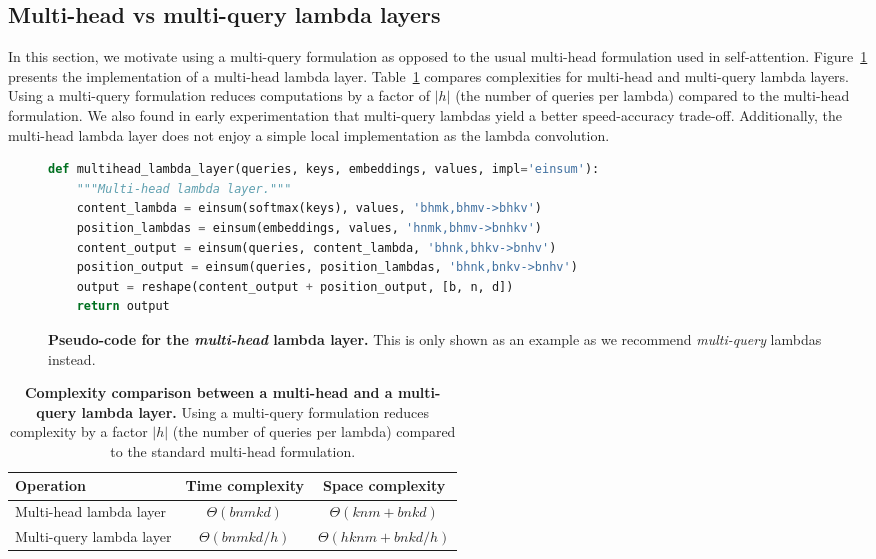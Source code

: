 \documentclass{article} \usepackage{iclr2021_conference,times}
\begin{document}
\subsection{Multi-head vs multi-query lambda layers}
In this section, we motivate using a multi-query formulation as opposed to the usual multi-head formulation used in self-attention.
Figure~\ref{fig:multihead_lambda_layer_code} presents the implementation of a multi-head lambda layer.
Table~\ref{tab:multihead_vs_multiquery} compares complexities for multi-head and multi-query lambda layers.
Using a multi-query formulation reduces computations by a factor of $|h|$ (the number of queries per lambda) compared to the multi-head formulation.
We also found in early experimentation that multi-query lambdas yield a better speed-accuracy trade-off.
Additionally, the multi-head lambda layer does not enjoy a simple local implementation as the lambda convolution.

\begin{figure}[h]
\small
\begin{lstlisting}[language=python]
def multihead_lambda_layer(queries, keys, embeddings, values, impl='einsum'):
    """Multi-head lambda layer."""
    content_lambda = einsum(softmax(keys), values, 'bhmk,bhmv->bhkv')
    position_lambdas = einsum(embeddings, values, 'hnmk,bhmv->bnhkv')
    content_output = einsum(queries, content_lambda, 'bhnk,bhkv->bnhv')
    position_output = einsum(queries, position_lambdas, 'bhnk,bnkv->bnhv')
    output = reshape(content_output + position_output, [b, n, d])
    return output
\end{lstlisting}
    \caption{
    \textbf{Pseudo-code for the \emph{multi-head} lambda layer.}
    This is only shown as an example as we recommend \emph{multi-query} lambdas instead.
    }
    \label{fig:multihead_lambda_layer_code}
\end{figure}

\begin{table}[h!]
  \begin{center}
  \small
  \begin{tabular}{l|cc}
    \toprule
    Operation & Time complexity & Space complexity \\
    \midrule
    Multi-head lambda layer & $\Theta(bnmkd)$ & $\Theta(knm + bnkd)$ \\
    Multi-query lambda layer & $\Theta(bnmkd/h)$ & $\Theta(hknm + bnkd/h)$ \\
    \bottomrule
  \end{tabular}
  \caption{
  \textbf{Complexity comparison between a multi-head and a multi-query lambda layer.} 
  Using a multi-query formulation reduces complexity by a factor $|h|$ (the number of queries per lambda) compared to the standard multi-head formulation.}
  \label{tab:multihead_vs_multiquery}
\end{center}
\end{table}
\end{document}
